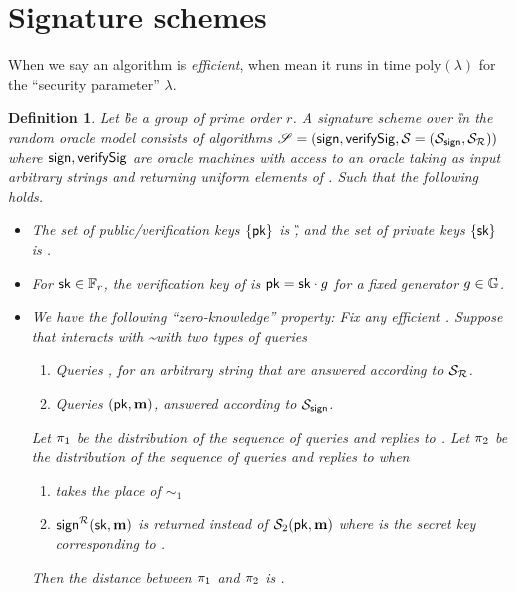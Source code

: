 \documentclass[11pt]{article}
\numberwithin{equation}{section} %
\numberwithin{figure}{section} %
\newtheorem{dfn}[thm]{Definition}
\newcommand{\set}[1]{\ensuremath{\left\{#1\right\}}\xspace}
\newcommand{\poly}{\ensuremath{\mathrm{poly}(\lambda)}\xspace}
\begin{document}
\section{Signature schemes}

When we say an algorithm \adv is \emph{efficient}, when mean it runs in time \poly for the ``security parameter'' $\lambda$.


 \begin{dfn}\label{dfn:sigscheme}
Let \G be a group of prime order $r$.
A signature scheme \sigscheme over \G in the random oracle model consists of algorithms $\mathscr S = (\mathsf{sign},\mathsf{verifySig}, {\mathcal S}= ( {\mathcal S}_{\mathsf{sign}}, {\mathcal S}_{\mathcal R}))$
where $\mathsf{sign},\mathsf{verifySig}$ are oracle machines with access to an oracle \RO taking as input arbitrary strings and returning uniform elements of \F.
Such that the following holds.
 \begin{itemize}
  \item The set of public/verification keys \set{\pk} is \G, and the set of private keys \set{\sk} is \F.
  \item For $\mathsf{sk} \in {\mathbb F}_r$, the verification key of \sk is $\mathsf{pk}= \mathsf{sk}\cdot g$ for a fixed generator $g\in \mathbb{G}$.
  \item We have the following ``zero-knowledge'' property:
 Fix any efficient \adv.
 Suppose that \adv interacts with \sim with two types of queries 
  \begin{enumerate}
   \item Queries \str, for an arbitrary string \str that are answered according to $ {\mathcal S}_{\mathcal R}$.
   \item Queries $(\mathsf{pk},\mathbf m)$, answered according to $ {\mathcal S}_{\mathsf{sign}}$.
  \end{enumerate}
Let $\mathrm{\pi}_1$ be the distribution of the sequence of queries and replies to \adv.
Let $\mathrm{\pi}_2$ be the distribution of the sequence of queries and replies to \adv when

\begin{enumerate}
 \item \RO takes the place of  $\sim_1$
 \item $\mathsf{sign}^{\mathcal R}(\mathsf{sk},\mathbf m)$ is returned instead of $ {\mathcal S}_2(\mathsf{pk},\mathbf m)$ where \sk is the secret key corresponding to \pk.
\end{enumerate}
Then the distance between $\mathrm{\pi}_1$ and $\mathrm{\pi}_2$ is \negl.
\end{itemize}


\end{dfn}
\end{document}
